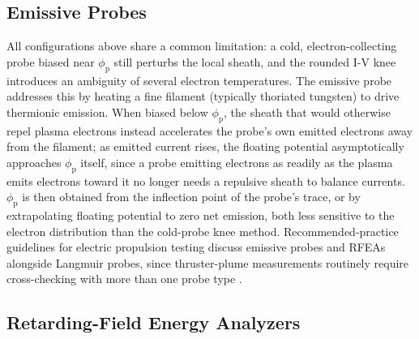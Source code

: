 \subsection{Emissive Probes}

All configurations above share a common limitation: a cold, electron-collecting probe biased near $\phi_{\mathrm{p}}$ still perturbs the local sheath, and the rounded I-V knee introduces an ambiguity of several electron temperatures. The emissive probe addresses this by heating a fine filament (typically thoriated tungsten) to drive thermionic emission. When biased below $\phi_{\mathrm{p}}$, the sheath that would otherwise repel plasma electrons instead accelerates the probe's own emitted electrons away from the filament; as emitted current rises, the floating potential asymptotically approaches $\phi_{\mathrm{p}}$ itself, since a probe emitting electrons as readily as the plasma emits electrons toward it no longer needs a repulsive sheath to balance currents. $\phi_{\mathrm{p}}$ is then obtained from the inflection point of the probe's trace, or by extrapolating floating potential to zero net emission, both less sensitive to the electron distribution than the cold-probe knee method. Recommended-practice guidelines for electric propulsion testing discuss emissive probes and RFEAs alongside Langmuir probes, since thruster-plume measurements routinely require cross-checking with more than one probe type \cite{ref0226}.

\subsection{Retarding-Field Energy Analyzers}


